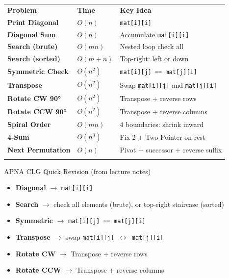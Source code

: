 \documentclass[12pt,a4paper,oneside]{book}
\renewcommand{\arraystretch}{1.35}
\begin{document}
\begin{center}
\renewcommand{\arraystretch}{1.55}
\setlength{\tabcolsep}{9pt}
\begin{tabular}{
  !{\color{myblue}\vrule width 1.2pt}
  >{\bfseries}p{4.8cm}
  !{\color{myblue!40}\vrule}
  p{2.6cm}
  !{\color{myblue!40}\vrule}
  p{5.8cm}
  !{\color{myblue}\vrule width 1.2pt}
}
\hline
{}
\color{white}\textbf{Problem} &
\color{white}\textbf{Time} &
\color{white}\textbf{Key Idea}\\
\hline
{}
Print Diagonal        & $O(n)$       & \texttt{mat[i][i]}\\
Diagonal Sum          & $O(n)$       & Accumulate \texttt{mat[i][i]}\\
Search (brute)        & $O(mn)$      & Nested loop check all\\
Search (sorted)       & $O(m+n)$     & Top-right: left or down\\
Symmetric Check       & $O(n^2)$     & \texttt{mat[i][j] == mat[j][i]}\\
Transpose             & $O(n^2)$     & Swap \texttt{mat[i][j]} and \texttt{mat[j][i]}\\
Rotate CW 90°         & $O(n^2)$     & Transpose + reverse rows\\
Rotate CCW 90°        & $O(n^2)$     & Transpose + reverse columns\\
Spiral Order          & $O(mn)$      & 4 boundaries: shrink inward\\
4-Sum                 & $O(n^3)$     & Fix 2 + Two-Pointer on rest\\
Next Permutation      & $O(n)$       & Pivot + successor + reverse suffix\\
\hline
\end{tabular}
\end{center}

\vspace{6pt}
\begin{definitionbox}{APNA CLG Quick Revision (from lecture notes)}
\begin{itemize}
  \item \textbf{Diagonal} $\to$ \texttt{mat[i][i]}
  \item \textbf{Search} $\to$ check all elements (brute), or top-right staircase (sorted)
  \item \textbf{Symmetric} $\to$ \texttt{mat[i][j] == mat[j][i]}
  \item \textbf{Transpose} $\to$ swap \texttt{mat[i][j] $\leftrightarrow$ mat[j][i]}
  \item \textbf{Rotate CW} $\to$ Transpose + reverse rows
  \item \textbf{Rotate CCW} $\to$ Transpose + reverse columns
\end{itemize}
\end{definitionbox}
\end{document}
